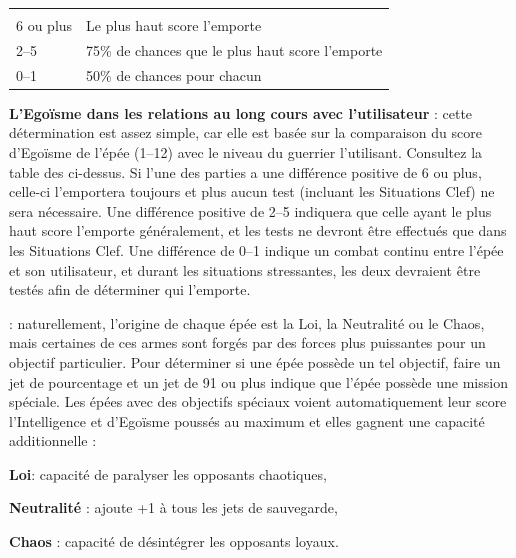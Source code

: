 \documentclass[11pt]{article}
\newcommand{\myunderline}[1]{\underline{\smash{#1}}}
\begin{document}
{{\begin{center}
\begin{minipage}{0.8\linewidth}
\bigskip

{\parindent0.5cm \begin{tabular}{ll}
\textbf{\myunderline{Différence}} & \myunderline{\textbf{Résultat}} \\
6 ou plus & Le plus haut score l'emporte \\
2--5 & 75\% de chances que le plus haut score l'emporte \\
0--1 & 50\% de chances pour chacun \\
\end{tabular}}

\bigskip

\textbf{L'Egoïsme dans les relations au long cours avec l'utilisateur} : cette détermination est assez simple, car elle est basée sur la comparaison du score d'Egoïsme de l'épée (1--12) avec le niveau du guerrier l'utilisant. Consultez la table des \myunderline{Situations Clef} ci-dessus. Si l'une des parties a une différence positive de 6 ou plus, celle-ci l'emportera toujours et plus aucun test (incluant les Situations Clef) ne sera nécessaire. Une différence positive de 2--5 indiquera que celle ayant le plus haut score l'emporte généralement, et les tests ne devront être effectués que dans les Situations Clef. Une différence de 0--1 indique un combat continu entre l'épée et son utilisateur, et durant les situations stressantes, les deux devraient être testés afin de déterminer qui l'emporte.

\end{minipage}
\end{center}

\myunderline{\textbf{Origine/Objectif}} : naturellement, l'origine de chaque épée est la Loi, la Neutralité ou le Chaos, mais certaines de ces armes sont forgés par des forces plus puissantes pour un objectif particulier. Pour déterminer si une épée possède un tel objectif, faire un jet de pourcentage et un jet de 91 ou plus indique que l'épée possède une mission spéciale. Les épées avec des objectifs spéciaux voient automatiquement leur score l'Intelligence et d'Egoïsme poussés au maximum et elles gagnent une capacité additionnelle :

\bigskip

{\parindent1cm \textbf{Loi}: capacité de paralyser les opposants chaotiques,

\textbf{Neutralité} : ajoute +1 à tous les jets de sauvegarde,

\textbf{Chaos} : capacité de désintégrer les opposants loyaux.}

}}
\end{document}
